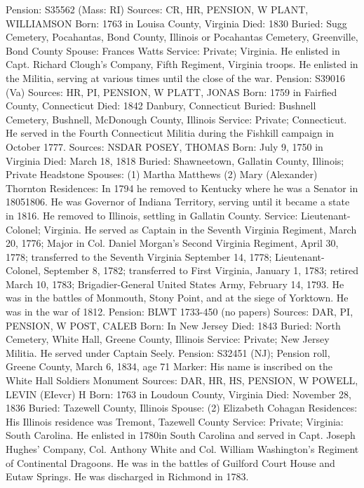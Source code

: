 Pension: S35562 (Mass: RI) 
Sources: CR, HR, PENSION, W 
PLANT, WILLIAMSON 
Born: 1763 in Louisa County, Virginia
Died: 1830
Buried: Sugg Cemetery, Pocahantas, Bond County, Illinois or Pocahantas Cemetery, Greenville, Bond County 
Spouse: Frances Watts
Service: Private; Virginia. He enlisted in Capt. Richard Clough's Company, Fifth Regiment, Virginia troops. He enlisted in the Militia, serving at various times until the close of the war. Pension: S39016 (Va) Sources: HR, PI, PENSION, W 
PLATT, JONAS 
Born: 1759 in Fairfied County, Connecticut
Died: 1842 Danbury, Connecticut
Buried: Bushnell Cemetery, Bushnell, McDonough County, Illinois
Service: Private; Connecticut. He served in the Fourth Connecticut Militia during the Fishkill campaign in October 1777. 
Sources: NSDAR 
POSEY, THOMAS 
Born: July 9, 1750 in Virginia
Died: March 18, 1818
Buried: Shawneetown, Gallatin County, Illinois; Private Headstone 
Spouses: (1) Martha Matthews 
	 (2) Mary (Alexander) Thornton 
Residences: In 1794 he removed to Kentucky where he was a Senator in 1805­1806. He was Governor of Indiana Territory, serving until it became a state in 1816. He removed to Illinois, settling in Gallatin County. 
Service: 	Lieutenant-Colonel; Virginia. He served as Captain in the Seventh Virginia Regiment, March 20, 1776; Major in Col. Daniel Morgan's Second Virginia Regiment, April 30, 1778; transferred to the Seventh Virginia Septem­ber 14, 1778; Lieutenant-Colonel, September 8, 1782; transferred to First Virginia, January 1, 1783; retired March 10, 1783; Brigadier-General United States Army, February 14, 1793. He was in the battles of Monmouth, Stony Point, and at the siege of Yorktown. He was in the war of 1812. 
Pension: BLWT 1733-450 (no papers) 
Sources: DAR, PI, PENSION, W 
POST, CALEB
Born: In New Jersey
Died: 1843
Buried: North Cemetery, White Hall, Greene County, Illinois
Service: Private; New Jersey Militia. He served under Captain Seely. 
Pension: S32451 (NJ); Pension roll, Greene County, March 6, 1834, age 71
Marker: His name is inscribed on the White Hall Soldiers Monument
Sources: DAR, HR, HS, PENSION, W 
POWELL, LEVIN (EIevcr) H
Born: 1763 in Loudoun County, Virginia
Died: November 28, 1836
Buried: Tazewell County, Illinois 
Spouse: (2) Elizabeth Cohagan
Residences: His Illinois residence was Tremont, Tazewell County
Service: Private; Virginia: South Carolina. He enlisted in 1780in South Carolina and served in Capt. Joseph Hughes' Company, Col. Anthony White and Col. William Washington's Regiment of Continental Dragoons. He was in the battles of Guilford Court House and Eutaw Springs. He was discharged in Richmond in 1783. 
